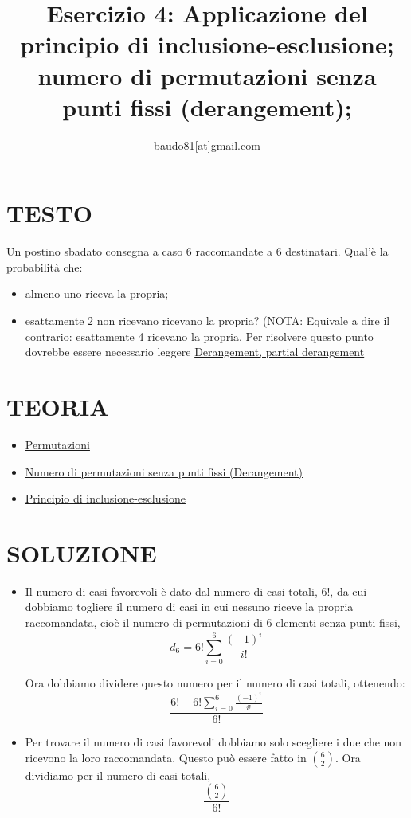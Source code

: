 \documentclass[a4paper,10pt]{article}
\title{Esercizio 4: Applicazione del principio di inclusione-esclusione; numero di permutazioni senza punti fissi (derangement); }
\author{baudo81[at]gmail.com}
\begin{document}
\maketitle



\section{TESTO}
Un postino sbadato consegna a caso 6 raccomandate a 6 destinatari.
Qual'è la probabilità che:
\begin{itemize}
 \item almeno uno riceva la propria;
 \item esattamente 2 non ricevano ricevano la propria? (NOTA: Equivale a dire il contrario: esattamente 4 ricevano la propria. Per risolvere questo punto dovrebbe essere necessario leggere \href{./Derangement.html}{Derangement, partial derangement}
\end{itemize}


\section{TEORIA}
\begin{itemize}
 \item \href{./Permutazioni.html}{Permutazioni}
 \item \href{./Derangement.html}{Numero di permutazioni senza punti fissi (Derangement)}
 \item \href{./PrincipioInclusioneEsclusione.html}{Principio di inclusione-esclusione}
\end{itemize}


\section{SOLUZIONE}
\begin{itemize}
 \item Il numero di casi favorevoli è dato dal numero di casi totali, $6!$, da cui dobbiamo togliere il numero di casi in cui nessuno
 riceve la propria raccomandata, cioè il numero di permutazioni di 6 elementi senza punti fissi, 
 \[d_{6} = 6!\sum^{6}_{i=0} \frac{(-1)^i}{i!} \]
 
 Ora dobbiamo dividere questo numero per il numero di casi totali, ottenendo:
 \[
  \frac{6! - 6!\sum^{6}_{i=0} \frac{(-1)^i}{i!}}{6!}
 \]

 
 \item Per trovare il numero di casi favorevoli dobbiamo solo scegliere i due che non ricevono la loro raccomandata. Questo può essere
 fatto in ${6 \choose 2}$.
 Ora dividiamo per il numero di casi totali,
 \[
  \frac{{6 \choose 2}}{6!}
 \]

\end{itemize}
\end{document}
